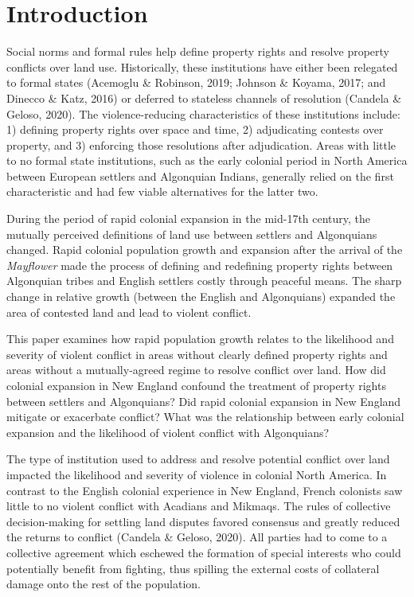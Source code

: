 \documentclass[sn-mathphys]{sn-jnl}%
\theoremstyle{thmstyleone}%
\theoremstyle{thmstyletwo}%
\theoremstyle{thmstylethree}%
\begin{document}
\section{Introduction}\label{sec1}

Social norms and formal rules help define property rights and resolve property conflicts over land use. Historically, these institutions have either been relegated to formal states %
(Acemoglu \& Robinson, 2019; Johnson \& Koyama, 2017; and Dinecco \& Katz, 2016) or deferred to stateless channels of resolution (Candela \& Geloso, 2020). The violence-reducing characteristics of these institutions include: 1) defining property rights over space and time, 2) adjudicating contests over property, and 3) enforcing those resolutions after adjudication. Areas with little to no formal state institutions, such as the early colonial period in North America between European settlers and Algonquian Indians, generally relied on the first characteristic and had few viable alternatives for the latter two. 

During the period of rapid colonial expansion in the mid-17th century, the mutually perceived definitions of land use between settlers and Algonquians changed. Rapid colonial population growth and expansion after the arrival of the {\em Mayflower} made the process of defining and redefining property rights between Algonquian tribes and English settlers costly through peaceful means. The sharp change in relative growth (between the English and Algonquians) expanded the area of contested land and lead to violent conflict.

This paper examines how rapid population growth relates to the likelihood and severity of violent conflict in areas without clearly defined property rights and areas without a mutually-agreed regime to resolve conflict over land. How did colonial expansion in New England confound the treatment of property rights between settlers and Algonquians?  Did rapid colonial expansion in New England mitigate or exacerbate conflict?  What was the relationship between early colonial expansion and the likelihood of violent conflict with Algonquians?

The type of institution used to address and resolve potential conflict over land impacted the likelihood and severity of violence in colonial North America. In contrast to the English colonial experience in New England, French colonists saw little to no violent conflict with Acadians and Mikmaqs. The rules of collective decision-making for settling land disputes favored consensus and greatly reduced the returns to conflict (Candela \& Geloso, 2020). All parties had to come to a collective agreement which eschewed the formation of special interests who could potentially benefit from fighting, thus spilling the external costs of collateral damage onto the rest of the population. 
\end{document}
